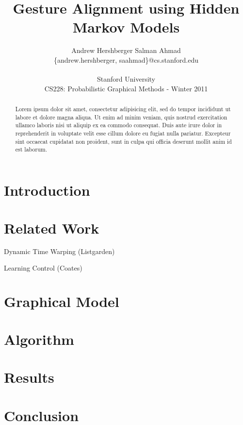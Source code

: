 \documentclass{article}
\title{Gesture Alignment using Hidden Markov Models}
\author{
Andrew Hershberger
\quad Salman Ahmad \\
\{andrew.hershberger, saahmad\}@cs.stanford.edu
\\\\
Stanford University\\
CS228: Probabilistic Graphical Methods - Winter 2011\\
}
\begin{document}
\maketitle

\begin{abstract}


Lorem ipsum dolor sit amet, consectetur adipisicing elit, sed do 
tempor incididunt ut labore et dolore magna aliqua. Ut enim ad minim veniam,
quis nostrud exercitation ullamco laboris nisi ut aliquip ex ea commodo
consequat. Duis aute irure dolor in reprehenderit in voluptate velit esse
cillum dolore eu fugiat nulla pariatur. Excepteur sint occaecat cupidatat non
proident, sunt in culpa qui officia deserunt mollit anim id est laborum.

\end{abstract}

\section{Introduction}

\section{Related Work}

Dynamic Time Warping (Listgarden)



Learning Control (Coates) \cite{Coates2008}

\section{Graphical Model}

\section{Algorithm}

\section{Results}

\section{Conclusion}





\end{document}

